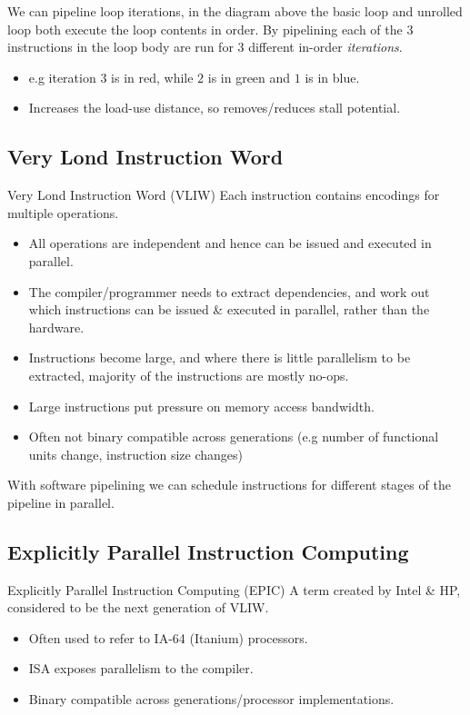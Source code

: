 We can pipeline loop iterations, in the diagram above the basic loop and unrolled loop both execute the loop contents in order. By pipelining each of the 3 instructions in the loop body are run for 3 different in-order \textit{iterations}.
\begin{itemize}
    \item e.g iteration $3$ is in red, while $2$ is in green and $1$ is in blue.
    \item Increases the load-use distance, so removes/reduces stall potential.
\end{itemize}

\subsection{Very Lond Instruction Word}
\begin{definitionbox}{Very Lond Instruction Word (VLIW)}
    Each instruction contains encodings for multiple operations.
    \begin{itemize}
        \item All operations are independent and hence can be issued and executed in parallel.
        \item The compiler/programmer needs to extract dependencies, and work out which instructions can be issued \& executed in parallel, rather than the hardware.
        \item Instructions become large, and where there is little parallelism to be extracted, majority of the instructions are mostly no-ops.
        \item Large instructions put pressure on memory access bandwidth.
        \item Often not binary compatible across generations (e.g number of functional units change, instruction size changes)
    \end{itemize}
\end{definitionbox}
With software pipelining we can schedule instructions for different stages of the pipeline in parallel.

\subsection{Explicitly Parallel Instruction Computing}
\begin{definitionbox}{Explicitly Parallel Instruction Computing (EPIC)}
    A term created by Intel \& HP, considered to be the next generation of VLIW. 
    \begin{itemize}
        \item Often used to refer to IA-64 (Itanium) processors.
        \item ISA exposes parallelism to the compiler.
        \item Binary compatible across generations/processor implementations.
    \end{itemize}
\end{definitionbox}

